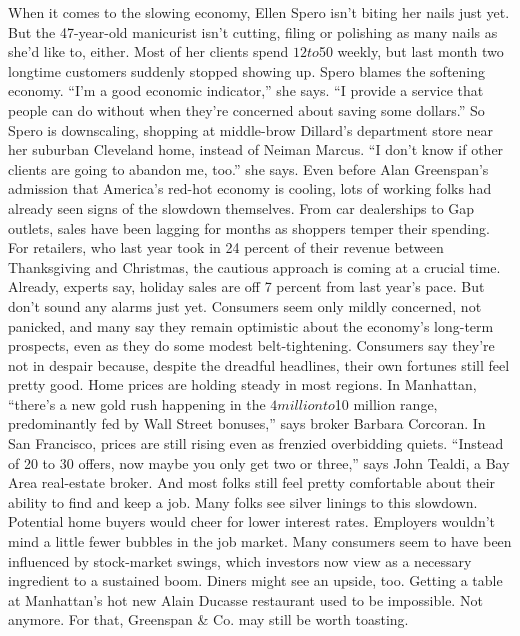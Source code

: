 When it comes to the slowing economy, Ellen Spero isn’t biting her nails just yet. But the 47-year-old manicurist isn’t cutting, filing or polishing as many nails as she’d like to, either. Most of her clients spend $12 to $50 weekly, but last month two longtime customers suddenly stopped showing up. Spero blames the softening economy. “I’m a good economic indicator,” she says. “I provide a service that people can do without when they’re concerned about saving some dollars.” So Spero is downscaling, shopping at middle-brow Dillard’s department store near her suburban Cleveland home, instead of Neiman Marcus. “I don’t know if other clients are going to abandon me, too.” she says.
Even before Alan Greenspan’s admission that America’s red-hot economy is cooling, lots of working folks had already seen signs of the slowdown themselves. From car dealerships to Gap outlets, sales have been lagging for months as shoppers temper their spending. For retailers, who last year took in 24 percent of their revenue between Thanksgiving and Christmas, the cautious approach is coming at a crucial time. Already, experts say, holiday sales are off 7 percent from last year’s pace. But don’t sound any alarms just yet. Consumers seem only mildly concerned, not panicked, and many say they remain optimistic about the economy’s long-term prospects, even as they do some modest belt-tightening.
Consumers say they’re not in despair because, despite the dreadful headlines, their own fortunes still feel pretty good. Home prices are holding steady in most regions. In Manhattan, “there’s a new gold rush happening in the $4 million to $10 million range, predominantly fed by Wall Street bonuses,” says broker Barbara Corcoran. In San Francisco, prices are still rising even as frenzied overbidding quiets. “Instead of 20 to 30 offers, now maybe you only get two or three,” says John Tealdi, a Bay Area real-estate broker. And most folks still feel pretty comfortable about their ability to find and keep a job.
Many folks see silver linings to this slowdown. Potential home buyers would cheer for lower interest rates. Employers wouldn’t mind a little fewer bubbles in the job market. Many consumers seem to have been influenced by stock-market swings, which investors now view as a necessary ingredient to a sustained boom. Diners might see an upside, too. Getting a table at Manhattan’s hot new Alain Ducasse restaurant used to be impossible. Not anymore. For that, Greenspan \& Co. may still be worth toasting.
